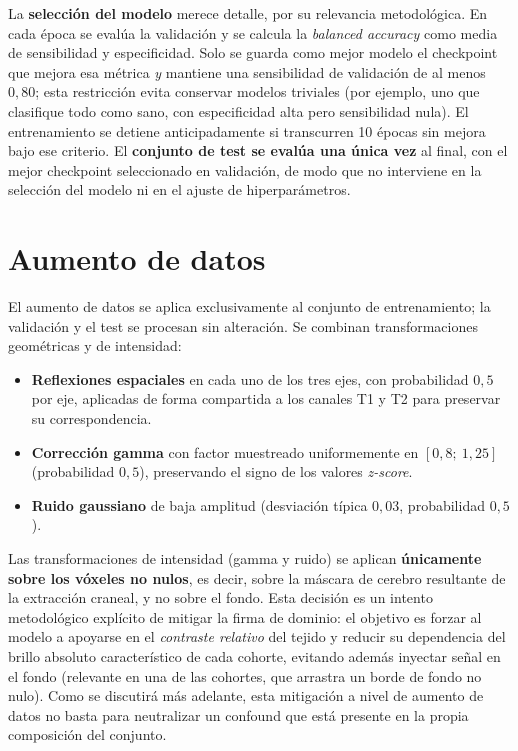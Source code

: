 La \textbf{selección del modelo} merece detalle, por su relevancia metodológica.
En cada época se evalúa la validación y se calcula la \emph{balanced accuracy}
como media de sensibilidad y especificidad. Solo se guarda como mejor modelo el
checkpoint que mejora esa métrica \emph{y} mantiene una sensibilidad de
validación de al menos $0{,}80$; esta restricción evita conservar modelos
triviales (por ejemplo, uno que clasifique todo como sano, con especificidad
alta pero sensibilidad nula). El entrenamiento se detiene anticipadamente si
transcurren 10 épocas sin mejora bajo ese criterio. El \textbf{conjunto de test
se evalúa una única vez} al final, con el mejor checkpoint seleccionado en
validación, de modo que no interviene en la selección del modelo ni en el ajuste
de hiperparámetros.

\section{Aumento de datos}

El aumento de datos se aplica exclusivamente al conjunto de entrenamiento; la
validación y el test se procesan sin alteración. Se combinan transformaciones
geométricas y de intensidad:

\begin{itemize}
  \item \textbf{Reflexiones espaciales} en cada uno de los tres ejes, con
  probabilidad $0{,}5$ por eje, aplicadas de forma compartida a los canales T1 y
  T2 para preservar su correspondencia.
  \item \textbf{Corrección gamma} con factor muestreado uniformemente en
  $[0{,}8;\ 1{,}25]$ (probabilidad $0{,}5$), preservando el signo de los valores
  \emph{z-score}.
  \item \textbf{Ruido gaussiano} de baja amplitud (desviación típica $0{,}03$,
  probabilidad $0{,}5$).
\end{itemize}

Las transformaciones de intensidad (gamma y ruido) se aplican \textbf{únicamente
sobre los vóxeles no nulos}, es decir, sobre la máscara de cerebro resultante de
la extracción craneal, y no sobre el fondo. Esta decisión es un intento
metodológico explícito de mitigar la firma de dominio: el objetivo es forzar al
modelo a apoyarse en el \emph{contraste relativo} del tejido y reducir su
dependencia del brillo absoluto característico de cada cohorte, evitando además
inyectar señal en el fondo (relevante en una de las cohortes, que arrastra un
borde de fondo no nulo). Como se discutirá más adelante, esta mitigación a nivel
de aumento de datos no basta para neutralizar un confound que está presente en
la propia composición del conjunto.

